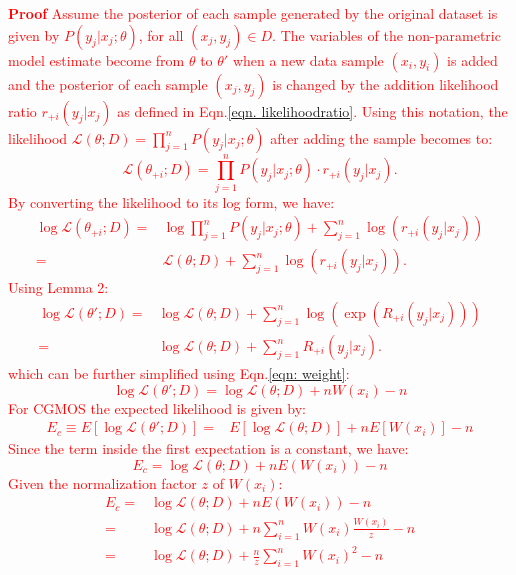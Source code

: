 \documentclass[10pt,journal,compsoc]{IEEEtran}
\begin{document}
\textcolor{red}{\noindent\textbf{Proof} Assume the posterior of each sample generated by the original dataset is given by $P(y_j|x_j;\theta)$, for all $(x_j, y_j)\in D$. The variables of the non-parametric model estimate become from $\theta$ to $\theta'$ when a new data sample $(x_i, y_i)$ is added and the posterior of each sample $(x_j, y_j)$ is changed by the addition likelihood ratio $r_{+i}(y_j|x_j)$ as defined in Eqn.\ref{eqn. likelihoodratio}. Using this notation, the likelihood $\mathcal{L}(\theta; D)=\prod_{j=1}^n P(y_j|x_j; \theta)$ after adding the sample becomes to:
\begin{equation}
\mathcal{L}(\theta_{+i}; D)=\prod_{j=1}^n P(y_j|x_j; \theta) \cdot r_{+i}(y_j|x_j).
\end{equation}
By converting the likelihood to its log form, we have:
\begin{align}
\log \mathcal{L}(\theta_{+i}; D)=&\log{\prod_{j=1}^n P(y_j|x_j; \theta)} +\sum_{j=1}^n \log(r_{+i}(y_j|x_j))\\
                            =&\mathcal{L}(\theta; D) + \sum_{j=1}^n \log(r_{+i}(y_j|x_j)).
\end{align}
Using Lemma 2:
\begin{align}
\log{\mathcal{L}(\theta'; D)}=&\log{\mathcal{L}(\theta; D)} + \sum_{j=1}^n \log(\exp(R_{+i}(y_j|x_j)))\\
							=&\log{\mathcal{L}(\theta; D)} + \sum_{j=1}^n R_{+i}(y_j|x_j).
\end{align}
which can be further simplified using Eqn.\ref{eqn: weight}:
\begin{equation}
\log{\mathcal{L}(\theta'; D)} = \log\mathcal{L}(\theta; D) + nW(x_i) - n
\end{equation}
For CGMOS the expected likelihood is given by:
\begin{align}
E_{c}\equiv E[\log\mathcal{L}(\theta'; D)]=&E[\log\mathcal{L}(\theta; D)] + nE[W(x_i)] - n
\end{align}
Since the term inside the first expectation is a constant, we have:
\begin{equation}
E_{c} = \log\mathcal{L}(\theta; D) + nE(W(x_i))-n
\end{equation}
Given the normalization factor $z$ of $W(x_i)$:
\begin{align}
E_{c} =& \log\mathcal{L}(\theta; D) + nE(W(x_i)) - n\\
		  =& \log\mathcal{L}(\theta; D) + n \sum_{i=1}^n W(x_i)\frac{W(x_i)}{z} - n\\
		  =& \log\mathcal{L}(\theta; D) + \frac{n}{z} \sum_{i=1}^n W(x_i)^2 -n

\end{align}}
\end{document}

